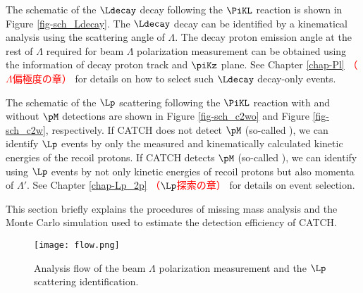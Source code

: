The schematic of the $\Ldecay$ decay following the $\PiKL$ reaction is shown in Figure \ref{fig-sch_Ldecay}. The $\Ldecay$ decay can be identified by a kinematical analysis using the scattering angle of $\Lambda$. The decay proton emission angle at the rest of $\Lambda$ required for beam $\Lambda$ polarization measurement can be obtained using the information of decay proton track and $\piKz$ plane. See Chapter \ref{chap-Pl} \textcolor{red}{（$\Lambda$偏極度の章）} for details on how to select such $\Ldecay$ decay-only events.

The schematic of the $\Lp$ scattering following the $\PiKL$ reaction with and without $\pM$ detections are shown in Figure \ref{fig-sch_c2wo} and Figure \ref{fig-sch_c2w}, respectively. If CATCH does not detect $\pM$ (so-called ), we can identify $\Lp$ events by only the measured and kinematically calculated kinetic energies of the recoil protons. If CATCH detects $\pM$ (so-called ), we can identify using $\Lp$ events by not only kinetic energies of recoil protons but also momenta of $\Lambda'$. See Chapter \ref{chap-Lp_2p} \textcolor{red}{（$\Lp$探索の章）} for details on event selection.

This section briefly explains the procedures of missing mass analysis and the Monte Carlo simulation used to estimate the detection efficiency of CATCH.

\begin{figure}[!h]
  \begin{center}
    \texttt{[image: flow.png]}
    \caption{Analysis flow of the beam $\Lambda$ polarization measurement and the $\Lp$ scattering identification.}
    \label{fig-flow}
  \end{center}
\end{figure}

